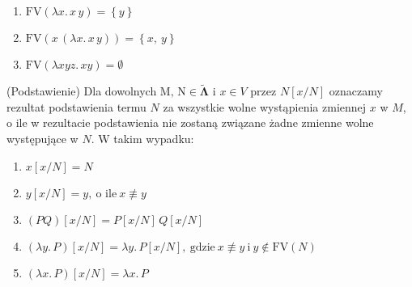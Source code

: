 \begin{przyklad}
  \begin{enumerate}[label=(\alph*)]
    \setlength\itemsep{0em}
    \item \(\mathrm{FV}(\lambda x.\,x\,y)=\left\{y\right\}\)
    \item \(\mathrm{FV}(x\,(\lambda x.\, x\,y)) = \left\{x,\ y\right\}\)
    \item \(\mathrm{FV}(\lambda x y z.\, x y) = \emptyset\)
  \end{enumerate}
\end{przyklad}

\begin{definicja}(Podstawienie)\label{def:substitution}
  Dla dowolnych \(\mathrm{M,\,N}\in\mathbf{\tilde\Lambda}\) i \(x\in V\) przez \(N[x/N]\) oznaczamy rezultat podstawienia termu \(N\) za wszystkie wolne wystąpienia zmiennej \(x\) w \(M\), o ile w rezultacie podstawienia nie zostaną związane żadne zmienne wolne występujące w \(N\). W takim wypadku:
  \begin{enumerate}[label={(S\arabic*)}, ref={(S\arabic*)}]
    \setlength\itemsep{0em}
    \item \(x[x/N] = N\)
    \item \(y[x/N] = y,\ \text{o ile}\ x\not\equiv y\)
    \item \((PQ)[x/N] = P[x/N]\,Q[x/N]\)\label{def:substitution_c}
    \item \((\lambda y.\, P)[x/N] = \lambda y.\,P[x/N],\ \text{gdzie}\ x\not\equiv y\ \text{i}\ y\not\in \mathrm{FV}(N)\)
    \item \((\lambda x.\, P)[x/N] = \lambda x.\,P\)\label{def:substitution_e}
  \end{enumerate}
\end{definicja}

